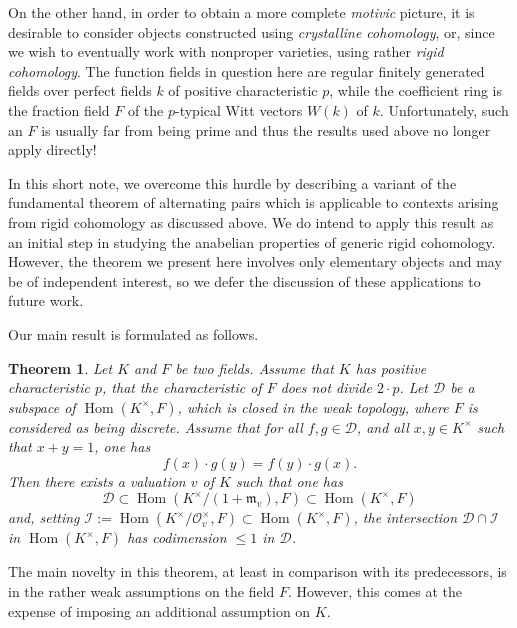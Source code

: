 \documentclass[12pt]{amsart}
\newcommand{\Hom}{\operatorname{Hom}}
\newcommand{\Dcal}{\mathcal{D}}
\newcommand{\Ical}{\mathcal{I}}
\newcommand{\mfrak}{\mathfrak{m}}
\newcommand{\Ocal}{\mathcal{O}}
\newtheorem{maintheorem}{Theorem}
\begin{document}
On the other hand, in order to obtain a more complete \emph{motivic} picture, it is desirable to consider objects constructed using \emph{crystalline cohomology}, or, since we wish to eventually work with nonproper varieties, using rather \emph{rigid cohomology}.
The function fields in question here are regular finitely generated fields over perfect fields $k$ of positive characteristic $p$, while the coefficient ring is the fraction field $F$ of the $p$-typical Witt vectors $W(k)$ of $k$.
Unfortunately, such an $F$ is usually far from being prime and thus the results used above no longer apply directly!

In this short note, we overcome this hurdle by describing a variant of the fundamental theorem of alternating pairs which is applicable to contexts arising from rigid cohomology as discussed above.
We do intend to apply this result as an initial step in studying the anabelian properties of generic rigid cohomology.
However, the theorem we present here involves only elementary objects and may be of independent interest, so we defer the discussion of these applications to future work.

Our main result is formulated as follows.

\begin{maintheorem}\label{maintheorem}
  Let $K$ and $F$ be two fields.
  Assume that $K$ has positive characteristic $p$, that the characteristic of $F$ does not divide $2 \cdot p$.
  Let $\Dcal$ be a subspace of $\Hom(K^{\times},F)$, which is closed in the weak topology, where $F$ is considered as being discrete.
  Assume that for all $f,g \in \Dcal$, and all $x,y \in K^{\times}$ such that $x + y = 1$, one has
  \[ f(x) \cdot g(y) = f(y) \cdot g(x). \]
  Then there exists a valuation $v$ of $K$ such that one has
  \[ \Dcal \subset \Hom(K^{\times}/(1+\mfrak_{v}),F) \subset \Hom(K^{\times},F) \]
  and, setting $\Ical := \Hom(K^{\times}/\Ocal_{v}^{\times},F) \subset \Hom(K^{\times},F)$, the intersection $\Dcal \cap \Ical$ in $\Hom(K^{\times},F)$ has codimension $\le 1$ in $\Dcal$.
\end{maintheorem}

The main novelty in this theorem, at least in comparison with its predecessors, is in the rather weak assumptions on the field $F$.
However, this comes at the expense of imposing an additional assumption on $K$.
\end{document}
